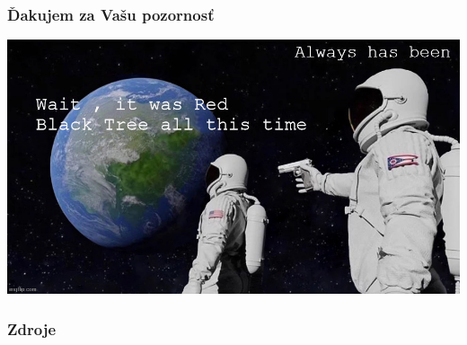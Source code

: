 \documentclass{beamer}
\begin{document}
    \begin{frame}
        \frametitle{Ďakujem za Vašu pozornosť}
        \includegraphics[width=\textwidth]{pic/meme}
    \end{frame}

    \begin{frame}
        \frametitle{Zdroje}~\nocite{*}
        
        
    \end{frame}
\end{document}
